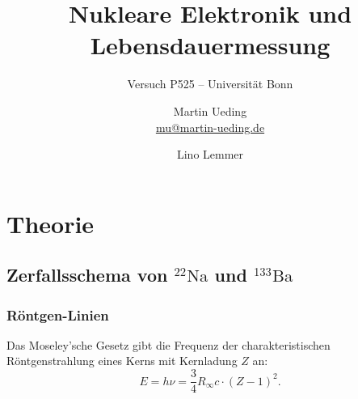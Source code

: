 

\usepackage{csquotes}

\usepackage{tikz}
\usetikzlibrary{chains}
\usetikzlibrary{shapes.geometric}


\usepackage{pgfplots}

\tikzexternalize

\usepackage{booktabs}

\hypersetup{
    pdftitle=
}

\subject{Praktikumsprotokoll}
\title{Nukleare Elektronik und Lebensdauermessung}
\subtitle{Versuch P525 -- Universität Bonn}
\author{
    Martin Ueding \\ \small{\href{mailto:mu@martin-ueding.de}{mu@martin-ueding.de}}
    \and
    Lino Lemmer
}
\publishers{Tutor: Damian-Maria Piontek}



\maketitle

\tableofcontents

\chapter{Theorie}

\section{Zerfallsschema von ${}^{22}\text{Na}$ und ${}^{133}\text{Ba}$}

\subsection{Röntgen-Linien}

Das Moseley'sche Gesetz gibt die Frequenz der charakteristischen
Röntgenstrahlung eines Kerns mit Kernladung $Z$ an:
\parencite[(17.10)]{meschede-gerthsen_24}
\begin{equation}
    \label{eq:moseley}
    E = h \nu = \frac 34 R_\infty c \cdot (Z - 1)^2.
\end{equation}

